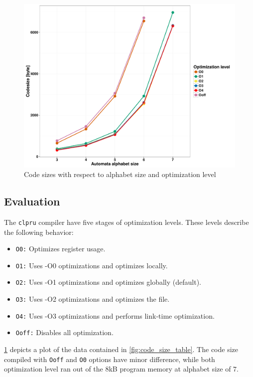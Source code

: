 \begin{figure}
	\centering
	\includegraphics[width = \textwidth]{include/figures/code_size}
	\caption{Code sizes with respect to alphabet size and optimization level}
\label{fig:code_size}
\end{figure}

\subsection{Evaluation}

The \texttt{clpru} compiler have five stages of optimization levels. These levels describe the following behavior:
\begin{itemize}
\item \texttt{O0:} Optimizes register usage.
\item \texttt{O1:} Uses -O0 optimizations and optimizes locally.
\item \texttt{O2:} Uses -O1 optimizations and optimizes globally (default).
\item \texttt{O3:} Uses -O2 optimizations and optimizes the file.
\item \texttt{O4:} Uses -O3 optimizations and performs link-time optimization.
\item \texttt{Ooff:} Disables all optimization.
\end{itemize}

\cref{fig:code_size} depicts a plot of the data contained in \cref{fig:code_size_table}. The code size compiled with \texttt{Ooff} and \texttt{O0} options have minor difference, while both optimization level ran out of the \si{8}{kB} program memory at alphabet size of $7$.

